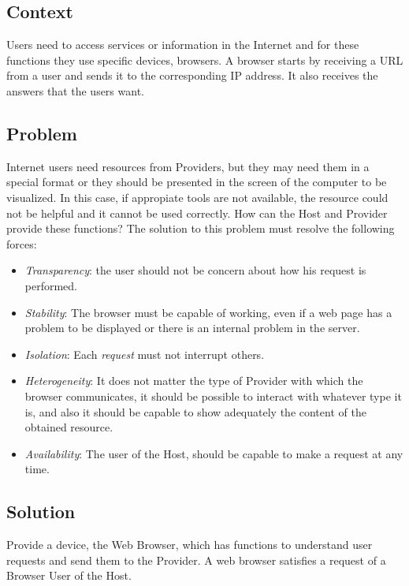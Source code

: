 \documentclass{sig-alternate-05-2015}
\begin{document}
  \subsection*{Context}
  Users need to access services or information in the Internet and for these functions they use specific devices, browsers. A browser starts by receiving a URL from a user and sends it to the corresponding IP address. It also receives the answers that the users want.

  \subsection*{Problem}
  Internet users need resources from Providers, but they may need them in a special format or they should be presented in the screen of the computer to be visualized. In this case, if appropiate tools are not available, the resource could not be helpful and it cannot be used correctly. How can the Host and Provider provide these functions? The solution to this problem must resolve the following forces:
  \begin{itemize}
    \item \textit{Transparency}: the user should not be concern about how his request is performed. 
    \item \textit{Stability}: The browser must be capable of working, even if a web page has a problem to be displayed or there is an internal problem in the server.
    \item \textit{Isolation}: Each \textit{request} must not interrupt others.
    \item \textit{Heterogeneity}: It does not matter the type of Provider with which the browser communicates, it should be possible to interact with whatever type it is, and also it should be capable to show adequately the content of the obtained resource.
    \item \textit{Availability}: The user of the Host, should be capable to make a request at any time.
  \end{itemize}

  \subsection*{Solution}
  Provide a device, the Web Browser, which has functions to understand user requests and send them to the Provider. A web browser satisfies a request of a Browser User of the Host.
\end{document}
